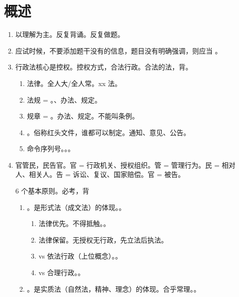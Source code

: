 \section{概述}
\begin{enumerate}
  \item 以理解为主。反复背诵。反复做题。
  \item 应试时候，不要添加题干没有的信息，题目没有明确强调，则应当 。
  \item 行政法核心是控权。控权方式，合法行政。合法的法，背。
        \begin{enumerate}
          \item 法律。全人大/全人常。xx 法。
          \item 法规 = 。、办法、规定。
          \item 规章 = 。办法、规定。不能叫条例。
          \item {}。俗称红头文件，谁都可以制定。通知、意见、公告。
          \item 命令序列号。。。
        \end{enumerate}
  \item 官管民，民告官。官 = 行政机关、授权组织。管 = 管理行为。民 = 相对人、相关人。告 = 诉讼、复议、国家赔偿。官 = 被告。
        \begin{kk}{6 个基本原则。必考，背}
          \begin{enumerate}
            \item {}。是形式法（成文法）的体现。。
                  \begin{enumerate}
                    \item 法律优先。不得抵触。。
                    \item 法律保留。无授权无行政，先立法后执法。
                    \item vs 依法行政（上位概念）。。
                    \item vs 合理行政。。
                  \end{enumerate}
            \item {}。是实质法（自然法，精神、理念）的体现。合乎常理。。
                  \begin{enumerate}

\end{enumerate}
\end{enumerate}
\end{kk}
\end{enumerate}
